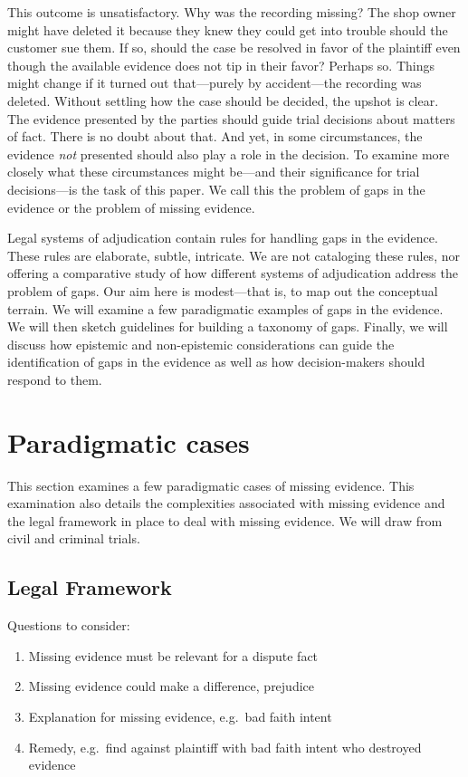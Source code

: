 \documentclass[
  10pt,
  dvipsnames,enabledeprecatedfontcommands]{scrartcl}
\begin{document}
This outcome is unsatisfactory. Why was the recording missing? The shop
owner might have deleted it because they knew they could get into
trouble should the customer sue them. If so, should the case be resolved
in favor of the plaintiff even though the available evidence does not
tip in their favor? Perhaps so. Things might change if it turned out
that---purely by accident---the recording was deleted. Without settling
how the case should be decided, the upshot is clear. The evidence
presented by the parties should guide trial decisions about matters of
fact. There is no doubt about that. And yet, in some circumstances, the
evidence \textit{not} presented should also play a role in the decision.
To examine more closely what these circumstances might be---and their
significance for trial decisions---is the task of this paper. We call
this the problem of gaps in the evidence or the problem of missing
evidence.

Legal systems of adjudication contain rules for handling gaps in the
evidence. These rules are elaborate, subtle, intricate. We are not
cataloging these rules, nor offering a comparative study of how
different systems of adjudication address the problem of gaps. Our aim
here is modest---that is, to map out the conceptual terrain. We will
examine a few paradigmatic examples of gaps in the evidence. We will
then sketch guidelines for building a taxonomy of gaps. Finally, we will
discuss how epistemic and non-epistemic considerations can guide the
identification of gaps in the evidence as well as how decision-makers
should respond to them.

\hypertarget{paradigmatic-cases}{%
\section{Paradigmatic cases}\label{paradigmatic-cases}}

This section examines a few paradigmatic cases of missing evidence. This
examination also details the complexities associated with missing
evidence and the legal framework in place to deal with missing evidence.
We will draw from civil and criminal trials.

\hypertarget{legal-framework}{%
\subsection{Legal Framework}\label{legal-framework}}

Questions to consider:

\begin{enumerate}
\def\labelenumi{(\arabic{enumi})}
\item
  Missing evidence must be relevant for a dispute fact
\item
  Missing evidence could make a difference, prejudice
\item
  Explanation for missing evidence, e.g.~bad faith intent
\item
  Remedy, e.g.~find against plaintiff with bad faith intent who
  destroyed evidence
\end{enumerate}
\end{document}

